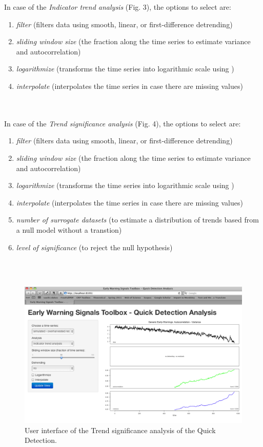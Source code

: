 \documentclass[12pt,a4paper,final]{article}
\begin{document}
\begin{doublespacing}
In case of the \textit{Indicator trend analysis} (Fig. 3), the options to select are:
\begin{enumerate}
\item  \textit{filter} (filters data using smooth, linear, or first-difference detrending)
\item \textit{sliding window size} (the fraction along the time series to estimate variance and autocorrelation)
\item \textit{logarithmize} (transforms the time series into logarithmic scale using )
\item \textit{interpolate} (interpolates the time series in case there are missing values)
\end{enumerate}\\
\\
In case of the \textit{Trend significance analysis} (Fig. 4), the options to select are:
\begin{enumerate}
\item  \textit{filter} (filters data using smooth, linear, or first-difference detrending)
\item \textit{sliding window size} (the fraction along the time series to estimate variance and autocorrelation)
\item \textit{logarithmize} (transforms the time series into logarithmic scale using )
\item \textit{interpolate} (interpolates the time series in case there are missing values)
\item \textit{number of surrogate datasets} (to estimate a distribution of trends based from a null model without a transtion)
\item \textit{level of significance} (to reject the null hypothesis)
\end{enumerate}\\
\\
\begin{figure}[ht]
\includegraphics[scale=0.4]{demo_start.png}
\caption{User interface of the Trend significance analysis of the Quick Detection.}
\end{figure}


\end{doublespacing}
\end{document}
